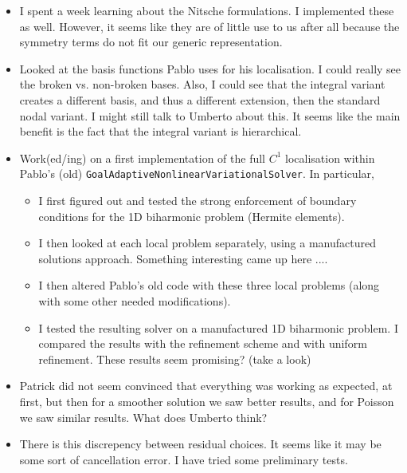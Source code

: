 \documentclass[12pt,a4paper]{article}
\begin{document}
\begin{itemize}
    \item I spent a week learning about the Nitsche formulations. I implemented these as well. However, it seems like they are of little use to us after all because the symmetry terms do not fit our generic representation. 
    \item Looked at the basis functions Pablo uses for his localisation. I could really see the broken vs. non-broken bases. Also, I could see that the integral variant creates a different basis, and thus a different extension, then the standard nodal variant. I might still talk to Umberto about this. It seems like the main benefit is the fact that the integral variant is hierarchical. 
    \item Work(ed/ing) on a first implementation of the full $C^1$ localisation within Pablo's (old) \texttt{GoalAdaptiveNonlinearVariationalSolver}. In particular, 
    \begin{itemize}
        \item I first figured out and tested the strong enforcement of boundary conditions for the 1D biharmonic problem (Hermite elements).
        \item I then looked at each local problem separately, using a manufactured solutions approach. Something interesting came up here .... 
        \item I then altered Pablo's old code with these three local problems (along with some other needed modifications). 
        \item I tested the resulting solver on a manufactured 1D biharmonic problem. I compared the results with the refinement scheme and with uniform refinement. These results seem promising? (take a look)
            \end{itemize}
    \item Patrick did not seem convinced that everything was working as expected, at first, but then for a smoother solution we saw better results, and for Poisson we saw similar results. What does Umberto think?
    \item There is this discrepency between residual choices. It seems like it may be some sort of cancellation error. I have tried some preliminary tests.

\end{itemize}
\end{document}
